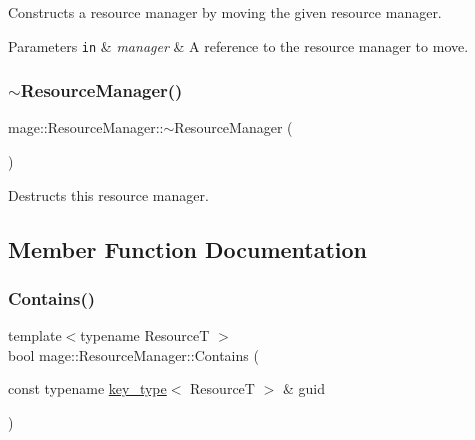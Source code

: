 Constructs a resource manager by moving the given resource manager.


\begin{DoxyParams}[1]{Parameters}
\mbox{\tt in}  & {\em manager} & A reference to the resource manager to move. \\
\hline
\end{DoxyParams}
\hypertarget{classmage_1_1_resource_manager_ad4bed85d3656f90072c5d47f50618add}{}\label{classmage_1_1_resource_manager_ad4bed85d3656f90072c5d47f50618add} 
\subsubsection{\texorpdfstring{$\sim$\+Resource\+Manager()}{~ResourceManager()}}
{\footnotesize\ttfamily mage\+::\+Resource\+Manager\+::$\sim$\+Resource\+Manager (\begin{DoxyParamCaption}{ }\end{DoxyParamCaption})\hspace{0.3cm}{\ttfamily [default]}}

Destructs this resource manager. 

\subsection{Member Function Documentation}
\hypertarget{classmage_1_1_resource_manager_a51a3fec3f1cd1ea71a8f8477b8008df2}{}\label{classmage_1_1_resource_manager_a51a3fec3f1cd1ea71a8f8477b8008df2} 
\subsubsection{\texorpdfstring{Contains()}{Contains()}}
{\footnotesize\ttfamily template$<$typename ResourceT $>$ \\
bool mage\+::\+Resource\+Manager\+::\+Contains (\begin{DoxyParamCaption}\item[{const typename \hyperlink{classmage_1_1_resource_manager_a5109dfe000a336d9fd2d467ba3dda5a1}{key\+\_\+type}$<$ ResourceT $>$ \&}]{guid }\end{DoxyParamCaption})\hspace{0.3cm}{\ttfamily [noexcept]}}

